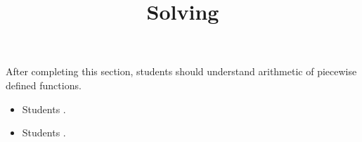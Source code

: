 \documentclass{ximera}
\title{Solving}
\begin{document}
\begin{abstract}
\end{abstract}

\maketitle

\begin{sectionOutcomes}

After completing this section, students should understand arithmetic of piecewise defined functions. 

\begin{itemize}
\item Students .
\item Students .
\end{itemize}

\end{sectionOutcomes}
\end{document}
